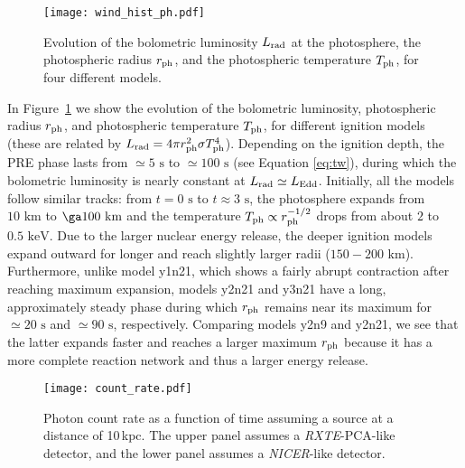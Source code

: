 \documentclass[apj,usenatbib, iop, twocolappendix]{emulateapj}
\newcommand{\Lrad}{L_{\rm rad}}
\newcommand{\trm}[1]{\textrm{#1}}
\begin{document}
 \begin{figure}
\texttt{[image: wind\_hist\_ph.pdf]}
\caption{Evolution of the bolometric luminosity  $\Lrad$ at the photosphere, the photospheric radius $r_{\rm ph}$, and the photospheric temperature $T_{\rm ph}$, for four different models.}
\label{fig:wind_hist}
\end{figure}

In Figure~\ref{fig:wind_hist} we show the evolution of the bolometric luminosity, photospheric radius $r_{\rm ph}$, and photospheric temperature $T_{\rm ph}$, for different ignition models (these are related by $\Lrad = 4\pi r_{\rm ph}^2\sigma T_{\rm ph}^4$).  Depending on the ignition depth, the PRE phase lasts from $\simeq 5\trm{ s}$ to $\simeq 100\trm{ s}$  (see Equation \ref{eq:tw}), during which the bolometric luminosity is nearly constant at $\Lrad \simeq L_{\rm Edd}$.  
Initially, all the models follow similar tracks: from $t=0\trm{ s}$ to $t\approx 3\trm{ s}$, the photosphere expands from $10\trm{ km}$ to $\ga 100\trm{ km}$ and the temperature $T_{\rm ph}\propto r_{\rm ph}^{-1/2}$ drops from about $2$ to $0.5 \trm{ keV}$.
Due to the larger nuclear energy release, the deeper ignition models expand outward for longer and reach slightly larger radii ($150-200\trm{ km}$).  Furthermore, unlike model y1n21, which shows a fairly abrupt contraction after reaching maximum expansion, models y2n21 and y3n21 have a long, approximately steady phase during which  $r_{\rm ph}$ remains near its maximum for $\simeq 20\trm{ s}$ and $\simeq 90\trm{ s}$, respectively.  Comparing models y2n9 and y2n21, we see that the latter expands faster and reaches a larger maximum $r_{\rm ph}$ because it has a more complete reaction network and thus a larger energy release.

 \begin{figure}
\texttt{[image: count\_rate.pdf]}
\caption{Photon count rate as a function of time assuming a source at a distance of 10\,kpc. The upper panel assumes a {\it RXTE}-PCA-like detector, and the lower panel assumes a {\it NICER}-like detector. }
\label{fig:xray_flux}
\end{figure}
\end{document}
